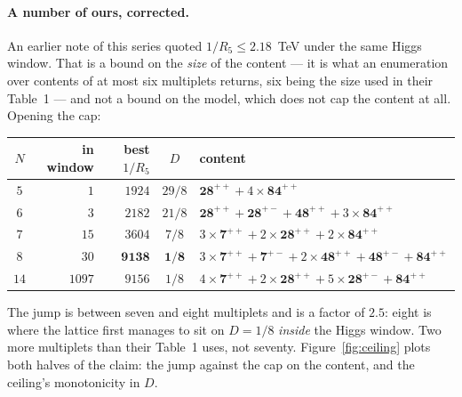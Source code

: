 \documentclass[11pt,a4paper]{article}
\newcommand{\rep}[1]{\mathbf{#1}}
\begin{document}
\paragraph{A number of ours, corrected.} An earlier note of this series quoted $1/R_5\le2.18$~TeV
under the same Higgs window. That is a bound on the \emph{size} of the content --- it is what an
enumeration over contents of at most six multiplets returns, six being the size used in their
Table~1 --- and not a bound on the model, which does not cap the content at all. Opening the cap:

\begin{center}\small
{}
\begin{tabular}{crrcl}
\toprule
\rowcolor{hdrblue!10}$N$ & in window & best $1/R_5$ & $D$ & content\\
\midrule
$5$  & $1$    & $1924$ & $29/8$ & $\rep{28}^{++}+4\times\rep{84}^{++}$\\
$6$  & $3$    & $2182$ & $21/8$ & $\rep{28}^{++}+\rep{28}^{+-}+\rep{48}^{++}+3\times\rep{84}^{++}$\\
$7$  & $15$   & $3604$ & $7/8$  & $3\times\rep7^{++}+2\times\rep{28}^{++}+2\times\rep{84}^{++}$\\
\rowcolor{amber!14}$8$  & $30$   & $\mathbf{9138}$ & $\mathbf{1/8}$ & $3\times\rep7^{++}+\rep7^{+-}+2\times\rep{48}^{++}+\rep{48}^{+-}+\rep{84}^{++}$\\
$14$ & $1097$ & $9156$ & $1/8$  & $4\times\rep7^{++}+2\times\rep{28}^{++}+5\times\rep{28}^{+-}+\rep{84}^{++}$\\
\bottomrule
\end{tabular}
\end{center}

\noindent The jump is between seven and eight multiplets and is a factor of $2.5$: eight is where
the lattice first manages to sit on $D=1/8$ \emph{inside} the Higgs window. Two more multiplets than
their Table~1 uses, not seventy. Figure~\ref{fig:ceiling} plots both halves of the claim: the jump
against the cap on the content, and the ceiling's monotonicity in $D$.
\end{document}
